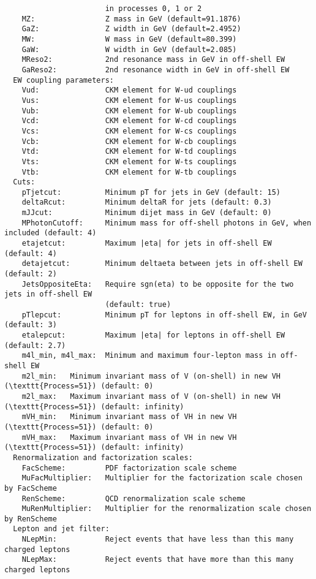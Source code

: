 \documentclass[aps,superscriptaddress,nofootinbib]{revtex4}
\begin{document}
\begin{verbatim}
                       in processes 0, 1 or 2
    MZ:                Z mass in GeV (default=91.1876)
    GaZ:               Z width in GeV (default=2.4952)
    MW:                W mass in GeV (default=80.399)
    GaW:               W width in GeV (default=2.085)
    MReso2:            2nd resonance mass in GeV in off-shell EW
    GaReso2:           2nd resonance width in GeV in off-shell EW
  EW coupling parameters:
    Vud:               CKM element for W-ud couplings
    Vus:               CKM element for W-us couplings
    Vub:               CKM element for W-ub couplings
    Vcd:               CKM element for W-cd couplings
    Vcs:               CKM element for W-cs couplings
    Vcb:               CKM element for W-cb couplings
    Vtd:               CKM element for W-td couplings
    Vts:               CKM element for W-ts couplings
    Vtb:               CKM element for W-tb couplings
  Cuts:
    pTjetcut:          Minimum pT for jets in GeV (default: 15)
    deltaRcut:         Minimum deltaR for jets (default: 0.3)
    mJJcut:            Minimum dijet mass in GeV (default: 0)
    MPhotonCutoff:     Minimum mass for off-shell photons in GeV, when included (default: 4)
    etajetcut:         Maximum |eta| for jets in off-shell EW (default: 4)
    detajetcut:        Minimum deltaeta between jets in off-shell EW (default: 2)
    JetsOppositeEta:   Require sgn(eta) to be opposite for the two jets in off-shell EW
                       (default: true)
    pTlepcut:          Minimum pT for leptons in off-shell EW, in GeV (default: 3)
    etalepcut:         Maximum |eta| for leptons in off-shell EW (default: 2.7)
    m4l_min, m4l_max:  Minimum and maximum four-lepton mass in off-shell EW
    m2l_min:   Minimum invariant mass of V (on-shell) in new VH (\texttt{Process=51}) (default: 0)
    m2l_max:   Maximum invariant mass of V (on-shell) in new VH (\texttt{Process=51}) (default: infinity)
    mVH_min:   Minimum invariant mass of VH in new VH (\texttt{Process=51}) (default: 0)
    mVH_max:   Maximum invariant mass of VH in new VH (\texttt{Process=51}) (default: infinity)
  Renormalization and factorization scales:
    FacScheme:         PDF factorization scale scheme
    MuFacMultiplier:   Multiplier for the factorization scale chosen by FacScheme
    RenScheme:         QCD renormalization scale scheme
    MuRenMultiplier:   Multiplier for the renormalization scale chosen by RenScheme
  Lepton and jet filter:
    NLepMin:           Reject events that have less than this many charged leptons
    NLepMax:           Reject events that have more than this many charged leptons

\end{verbatim}
\end{document}
